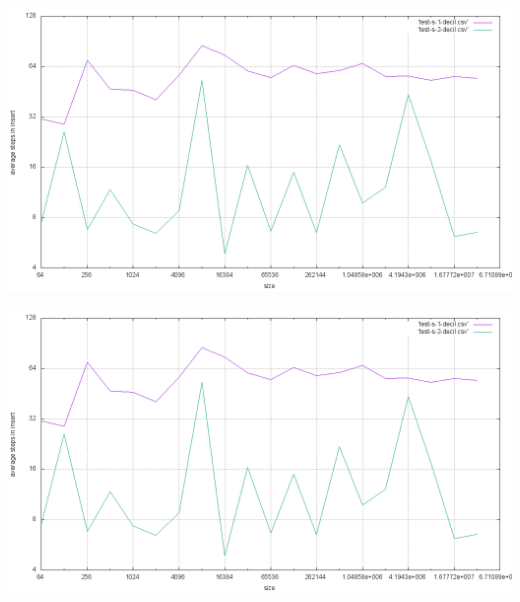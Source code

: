 \documentclass[12pt,a4paper]{report}
\begin{document}
\includegraphics[width=\textwidth]{./tests/sequence_test/uniform-test5.png}





\includegraphics[width=\textwidth]{./tests/sequence_test/uniform-test.png}
  
\end{document}
